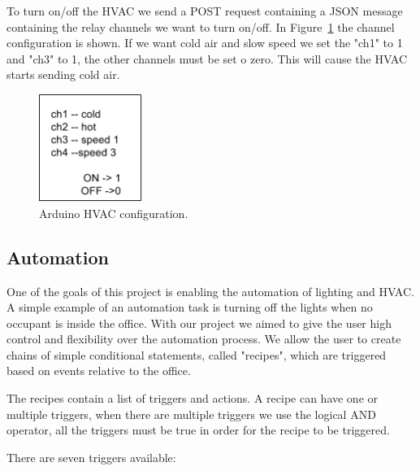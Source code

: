 To turn on/off the \ac{HVAC} we send a POST request containing a \ac{JSON} message containing the relay channels we want to turn on/off. In Figure~\ref{arduino_post_imp} the channel configuration is shown. If we want cold air   and slow speed we set the "ch1" to 1 and "ch3" to 1, the other channels must be set o zero. This will cause the \ac{HVAC} starts sending cold air.


\begin{figure}[h]
\centering
\includegraphics[width=0.3\textwidth]{Figures/temperature_post_imp}
\caption{Arduino HVAC configuration.}
\label{arduino_post_imp}
\end{figure}









\subsection{Automation}

One of the goals of this project is enabling the automation of lighting and \ac{HVAC}. A simple example of an automation task is turning off the lights when no occupant is inside the office.
With our project we aimed to give the user high control and flexibility over the automation process. We allow the user to create chains of simple conditional statements, called "recipes", which are triggered based on events relative to the office.


The recipes contain a list of triggers and actions. A recipe can have one or multiple triggers, when there are multiple triggers we use the logical AND operator, all the triggers must be true in order for the recipe to be triggered.

There are seven triggers available:

